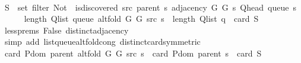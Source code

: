 \begin{isabellebody}
\ \ \ \ \isamarkupfalse%
\ {\isacharquery}{\kern0pt}S\ {\isacharequal}{\kern0pt}\ {\isachardoublequoteopen}set\ {\isacharparenleft}{\kern0pt}filter\ {\isacharparenleft}{\kern0pt}Not\ {\isasymcirc}\ is{\isacharunderscore}{\kern0pt}discovered\ src\ {\isacharparenleft}{\kern0pt}parent\ s{\isacharparenright}{\kern0pt}{\isacharparenright}{\kern0pt}\ {\isacharparenleft}{\kern0pt}adjacency\ G{}\ G{}\ s\ {\isacharparenleft}{\kern0pt}Q{\isacharunderscore}{\kern0pt}head\ {\isacharparenleft}{\kern0pt}queue\ s{\isacharparenright}{\kern0pt}{\isacharparenright}{\kern0pt}{\isacharparenright}{\kern0pt}{\isacharparenright}{\kern0pt}{\isachardoublequoteclose}\isanewline
\isanewline
\ \ \ \ \isamarkupfalse%
\ {\isachardoublequoteopen}length\ {\isacharparenleft}{\kern0pt}Q{\isacharunderscore}{\kern0pt}list\ {\isacharparenleft}{\kern0pt}queue\ {\isacharparenleft}{\kern0pt}alt{\isacharunderscore}{\kern0pt}fold\ G{}\ G{}\ src\ s{\isacharparenright}{\kern0pt}{\isacharparenright}{\kern0pt}{\isacharparenright}{\kern0pt}\ {\isacharequal}{\kern0pt}\ length\ {\isacharparenleft}{\kern0pt}Q{\isacharunderscore}{\kern0pt}list\ {\isacharquery}{\kern0pt}q{\isacharparenright}{\kern0pt}\ {\isacharplus}{\kern0pt}\ card\ {\isacharquery}{\kern0pt}S{\isachardoublequoteclose}\isanewline
\ \ \ \ \ \ \isamarkupfalse%
\ less{\isachardot}{\kern0pt}prems{\isacharparenleft}{\kern0pt}{}{\isacharminus}{\kern0pt}{}{\isacharparenright}{\kern0pt}\ False\ distinct{\isacharunderscore}{\kern0pt}adjacency\isanewline
\ \ \ \ \ \ \isamarkupfalse%
\ {\isacharparenleft}{\kern0pt}simp\ add{\isacharcolon}{\kern0pt}\ list{\isacharunderscore}{\kern0pt}queue{\isacharunderscore}{\kern0pt}alt{\isacharunderscore}{\kern0pt}fold{\isacharunderscore}{\kern0pt}cong\ distinct{\isacharunderscore}{\kern0pt}card{\isacharbrackleft}{\kern0pt}symmetric{\isacharbrackright}{\kern0pt}{\isacharparenright}{\kern0pt}\isanewline
\ \ \ \ \isamarkupfalse%
\ \isamarkupfalse%
\ {\isachardoublequoteopen}card\ {\isacharparenleft}{\kern0pt}P{\isachardot}{\kern0pt}dom\ {\isacharparenleft}{\kern0pt}parent\ {\isacharparenleft}{\kern0pt}alt{\isacharunderscore}{\kern0pt}fold\ G{}\ G{}\ src\ s{\isacharparenright}{\kern0pt}{\isacharparenright}{\kern0pt}{\isacharparenright}{\kern0pt}\ {\isacharequal}{\kern0pt}\ card\ {\isacharparenleft}{\kern0pt}P{\isachardot}{\kern0pt}dom\ {\isacharparenleft}{\kern0pt}parent\ s{\isacharparenright}{\kern0pt}{\isacharparenright}{\kern0pt}\ {\isacharplus}{\kern0pt}\ card\ {\isacharquery}{\kern0pt}S{\isachardoublequoteclose}\isanewline

\end{isabellebody}
